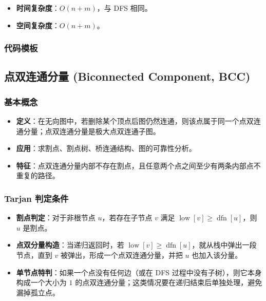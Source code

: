 \begin{itemize}
  \item \textbf{时间复杂度}：$O(n + m)$，与 DFS 相同。
  \item \textbf{空间复杂度}：$O(n + m)$。
\end{itemize}

\subsubsection{代码模板}



\subsection{点双连通分量 (Biconnected Component, BCC)}

\subsubsection{基本概念}

\begin{itemize}
  \item \textbf{定义}：在无向图中，若删除某个顶点后图仍然连通，则该点属于同一个点双连通分量；点双连通分量是极大点双连通子图。
  \item \textbf{应用}：求割点、割点树、桥连通结构、图的可靠性分析。
  \item \textbf{特征}：点双连通分量内部不存在割点，且任意两个点之间至少有两条内部点不重复的路径。
\end{itemize}

\subsubsection{Tarjan 判定条件}

\begin{itemize}
  \item \textbf{割点判定}：对于非根节点 $u$，若存在子节点 $v$ 满足 $\operatorname{low}[v] \ge \operatorname{dfn}[u]$，则 $u$ 是割点。
  \item \textbf{点双分量构造}：当递归返回时，若 $\operatorname{low}[v] \ge \operatorname{dfn}[u]$，就从栈中弹出一段节点，直到 $v$ 被弹出，形成一个点双连通分量，并把 $u$ 也加入该分量。
  \item \textbf{单节点特判}：如果一个点没有任何边（或在 DFS 过程中没有子树），则它本身构成一个大小为 $1$ 的点双连通分量；这类情况要在递归结束后单独处理，避免漏掉孤立点。
\end{itemize}

